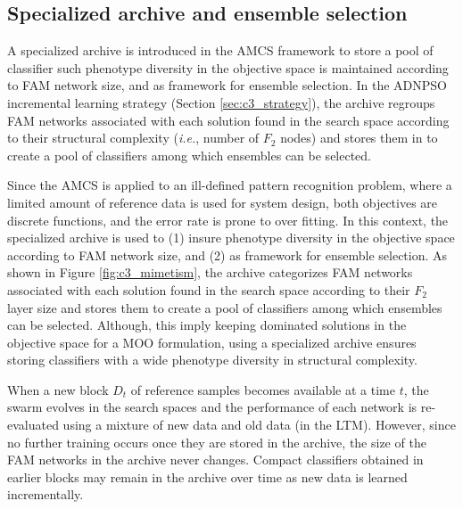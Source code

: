 \subsection{Specialized archive and ensemble selection}
\label{sec:c3_mimetism}

A specialized archive is introduced in the AMCS framework to store a pool of classifier such phenotype diversity in the objective space is maintained according to FAM network size, and as framework for ensemble selection.
In the ADNPSO incremental learning strategy (Section \ref{sec:c3_strategy}), the archive regroups FAM networks associated with each solution found in the search space according to their structural complexity (\emph{i.e.}, number of $F_2$ nodes) and stores them in to create a pool of classifiers among which ensembles can be selected.

Since the AMCS is applied to an ill-defined pattern recognition problem, where a limited amount of reference data is used for system design, both objectives are discrete functions, and the error rate is prone to over fitting.
In this context, the specialized archive is used to (1) insure phenotype diversity in the objective space according to FAM network size, and (2) as framework for ensemble selection.
As shown in Figure \ref{fig:c3_mimetism}, the archive categorizes FAM networks associated with each solution found in the search space according to their $F_2$ layer size and stores them to create a pool of classifiers among which ensembles can be selected.
Although, this imply keeping dominated solutions in the objective space for a MOO formulation, using a specialized archive ensures storing classifiers with a wide phenotype diversity in structural complexity.

When a new block $D_t$ of reference samples becomes available at a time $t$, the swarm evolves in the search spaces and the performance of each network is re-evaluated using a mixture of new data and old data (in the LTM).
However, since no further training occurs once they are stored in the archive, the size of the FAM networks in the archive never changes.
Compact classifiers obtained in earlier blocks may remain in the archive over time as new data is learned incrementally.

\begin{figure*}[t]
  \centering
 	\caption{Illustration of the specialized archive of solutions in the objective space.
The FAM network size objective is segmented in different domains (or slices of complexity), where both Pareto-optimal (circles) and locally Pareto-optimal (squares) solutions are kept in the archive.
The local best are defined as the most accurate network of each size domain}
	\label{fig:c3_mimetism}
\end{figure*}


